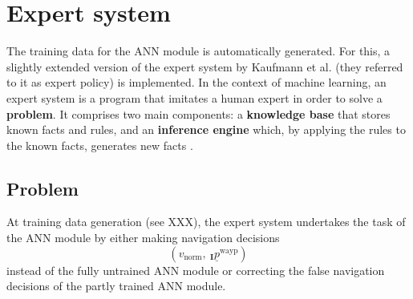 \section{Expert system} \label{sec:expert_system}

The training data for the ANN module is automatically generated.
For this, a slightly extended version of the expert system by Kaufmann et al. \cite{Kaufmann2018}  
(they referred to it as expert policy) is implemented.
In the context of machine learning, 
an expert system is a program that imitates a human expert
in order to solve a \textbf{problem}. 
It comprises two main components: a \textbf{knowledge base} 
that stores known facts and rules, and an
\textbf{inference engine} which, by applying the rules to the known facts,
generates new facts \cite{jackson1986introduction}.

\subsection*{Problem}
At training data generation (see XXX),
the expert system undertakes the task
of the ANN module by
either making navigation decisions
\begin{equation} \label{eq:nav_dec_by_expert}
    (v_\text{norm},\ {}_\textbf{I} \underline p^\text{wayp})   
\end{equation}
instead of the fully untrained ANN module
or correcting the false navigation decisions of the partly trained ANN module.




